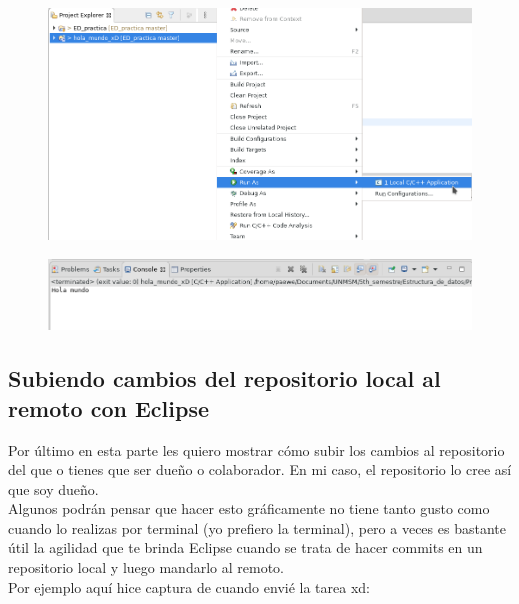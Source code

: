 \documentclass{article}
\begin{document}
\newpage

\begin{figure}[h!]
  \centering
  \includegraphics[scale=0.65]{./Pictures/029_hola_mundo_ejecutado.png}
\end{figure}

\begin{figure}[h!]
  \centering
  \includegraphics[scale=0.75]{./Pictures/030_ejecutado.png}
\end{figure}


\newpage

\subsection*{Subiendo cambios del repositorio local al remoto con Eclipse}%
Por último en esta parte les quiero mostrar cómo subir los cambios al
repositorio del que o tienes que ser dueño o colaborador. En mi caso, el
repositorio lo cree así que soy dueño.\\

Algunos podrán pensar que hacer esto gráficamente no tiene tanto gusto como
cuando lo realizas por terminal (yo prefiero la terminal), pero a veces es
bastante útil la agilidad que te brinda Eclipse cuando se trata de hacer
commits en un repositorio local y luego mandarlo al remoto.\\

Por ejemplo aquí hice captura de cuando envié la tarea xd:\\
\end{document}
